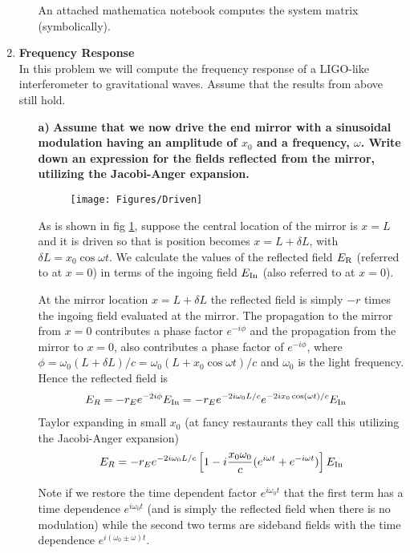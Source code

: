 \documentclass[11pt]{article}
\begin{document}
\begin{enumerate}
\begin{itemize}
An attached mathematica notebook computes the system matrix (symbolically).

\end{itemize}

\item
{\bf Frequency Response} \\
In this problem we will compute the frequency response of a LIGO-like interferometer to gravitational waves. Assume that the results from above still hold.
\begin{itemize}

\item[\bf a)] {\bf Assume that we now drive the end mirror with a sinusoidal modulation having an amplitude of $x_0$ and a frequency, $\omega$. Write down an expression for the fields reflected from the mirror, utilizing the Jacobi-Anger expansion.}

\begin{figure}[t]
\texttt{[image: Figures/Driven]}
\caption{
}
\label{fig:Driven}
\end{figure}

As is shown in fig \ref{fig:Driven}, suppose the central location of the mirror is $x=L$ and it is driven so that is position becomes $x=L+\delta L$, with $\delta L =x_0 \cos \omega t$. We calculate the values of the reflected field $E_{\rm R}$ (referred to at $x=0$) in terms of the ingoing field $E_{\rm In}$ (also referred to at $x=0$).

At the mirror location $x=L+\delta L$ the reflected field is simply $-r$ times the ingoing field evaluated at the mirror. The propagation to the mirror from $x=0$ contributes a phase factor $e^{-i\phi}$ and the propagation from the mirror to $x=0$, also contributes a phase factor of $e^{-i\phi}$, where $\phi=\omega_0(L+\delta L)/c=\omega_0(L+x_0\cos\omega t)/c$ and $\omega_0$ is the light frequency. Hence the reflected field is
\begin{align}
E_R&=-r_E e^{-2i\phi}E_{\rm In} 
=-r_E e^{-2i\omega_0L/c}e^{-2i x_0 \cos (\omega t)/c} E_{\rm In}
\end{align}
Taylor expanding in small $x_0$ (at fancy restaurants they call this utilizing the Jacobi-Anger expansion)
\begin{align}
E_R=-r_E e^{-2i\omega_0 L/c}\left[1-i\frac{x_0\omega_0}{c}(e^{i\omega t}+e^{-i\omega t})\right]E_{\rm In} \label{eq:side}
\end{align}

Note if we restore the time dependent factor $e^{i\omega_0t}$ that the first term has a time dependence $e^{i\omega_0t}$ (and is simply the reflected field when there is no modulation) while the second two terms are sideband fields with the time dependence $e^{i(\omega_0\pm\omega)t}$.


\end{itemize}
\end{enumerate}
\end{document}
